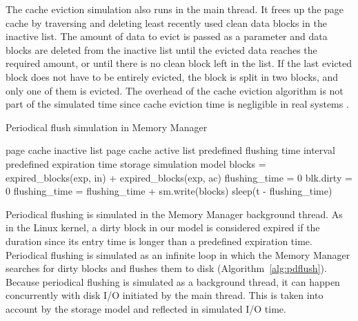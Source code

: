 \documentclass[conference]{IEEEtran}
\newcommand{\Desc}[2]{\State \makebox[2em][l]{#1}#2}
\newcommand{\tristan}[1]{}%
\begin{document}
    The cache eviction simulation also runs in
    the main thread. It frees up the page cache by traversing and deleting
    least recently used clean data blocks in the inactive list.
    The amount of data to evict is passed as a parameter and data blocks are deleted
    from the inactive list until the evicted data reaches the required amount,
    or until there is no clean block left in the list.
    If the last evicted block does not have to be entirely evicted, the block is split in two blocks,
    and only one of them is evicted.
    The overhead of the cache eviction algorithm is not part of the simulated time
    since cache eviction time is negligible in real systems \tristan{a reference would be welcome}.

    \begin{algorithm}[b]\caption{Periodical flush simulation in Memory Manager}\label{alg:pdflush}
        \small
        \begin{algorithmic}[1]
            \Input
                \Desc{in}{page cache inactive list}
                \Desc{ac}{page cache active list}
                \Desc{t}{predefined flushing time interval}
                \Desc{exp}{predefined expiration time}
                \Desc{sm}{storage simulation model}
               \EndInput
                \State blocks = expired\_blocks(exp, in) + expired\_blocks(exp, ac)
                \State flushing\_time = 0
                  \State blk.dirty = 0 
                  \State flushing\_time = flushing\_time + sm.write(blocks)
                \EndFor
                    \State sleep(t - flushing\_time)
                \EndIf  
            \EndWhile
        \end{algorithmic}
    \end{algorithm}

    Periodical flushing is simulated in the Memory Manager
    background thread. As in the Linux kernel, a dirty block
    in our model is considered expired if
    the duration since its entry time is longer than a
    predefined expiration time.
    Periodical flushing is simulated as an infinite loop in which
    the Memory Manager searches for dirty blocks and flushes them to disk (Algorithm~\ref{alg:pdflush}).
    Because periodical flushing is simulated as a background thread, it can happen concurrently
    with disk I/O initiated by the main thread. This is taken into account by the
    storage model and reflected in simulated I/O time.
\end{document}
